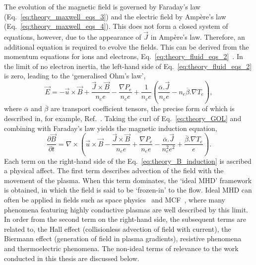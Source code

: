The evolution of the magnetic field is governed by Faraday's law (Eq.~\ref{eq:theory_maxwell_eqs_3}) and the electric field by Amp\`ere's law (Eq.~\ref{eq:theory_maxwell_eqs_4}).
This does not form a closed system of equations, however, due to the appearance of $\vec{J}$ in Amp\`ere's law.
Therefore, an additional equation is required to evolve the fields.
This can be derived from the momentum equations for ions and electrons, Eq.~\ref{eq:theory_fluid_eqs_2}~\cite{farrow_extended_2023}.
In the limit of no electron inertia, the left-hand side of Eq.~\ref{eq:theory_fluid_eqs_2} is zero, leading to the `generalised Ohm's law',
\begin{equation}
    \label{eq:theory_GOL}
    \vec{E} = -\vec{u}\times\vec{B} + \frac{\vec{J}\times\vec{B}}{n_e e} - \frac{\nabla P_e}{n_e e} + \frac{1}{n_e e}\left( \frac{ \overline{\alpha} . \vec{J} }{ n_e e } - n_e \overline{\beta} . \nabla T_e \right),
\end{equation}
where $\overline{\alpha}$ and $\overline{\beta}$ are transport coefficient tensors, the precise form of which is described in, for example, Ref.~\cite{oneill_modelling_2023}.
Taking the curl of Eq.~\ref{eq:theory_GOL} and combining with Faraday's law yields the magnetic induction equation,
\begin{equation}
    \label{eq:theory_B_induction}
    \frac{\partial \vec{B}}{\partial t} = \nabla \times \left( \vec{u}\times\vec{B} - \frac{\vec{J}\times\vec{B}}{n_e e} + \frac{\nabla P_e}{n_e e} - \frac{ \overline{\alpha} . \vec{J} }{ n_e^2 e^2 } + \frac{\overline{\beta} . \nabla T_e}{e} \right).
\end{equation}
Each term on the right-hand side of the Eq.~\ref{eq:theory_B_induction} is ascribed a physical affect.
The first term describes advection of the field with the movement of the plasma.
When this term dominates, the `ideal \ac{MHD}' framework is obtained, in which the field is said to be `frozen-in' to the flow.
Ideal \ac{MHD} can often be applied in fields such as space physics~\cite{parks_why_2004,mathioudakis_alfven_2013} and \ac{MCF}~\cite{boozer_equations_1998}, where many phenomena featuring highly conductive plasmas are well described by this limit.
In order from the second term on the right-hand side, the subsequent terms are related to, the Hall effect (collisionless advection of field with current), the Biermann effect (generation of field in plasma gradients), resistive phenomena and thermoelectric phenomena.
The non-ideal terms of relevance to the work conducted in this thesis are discussed below.

